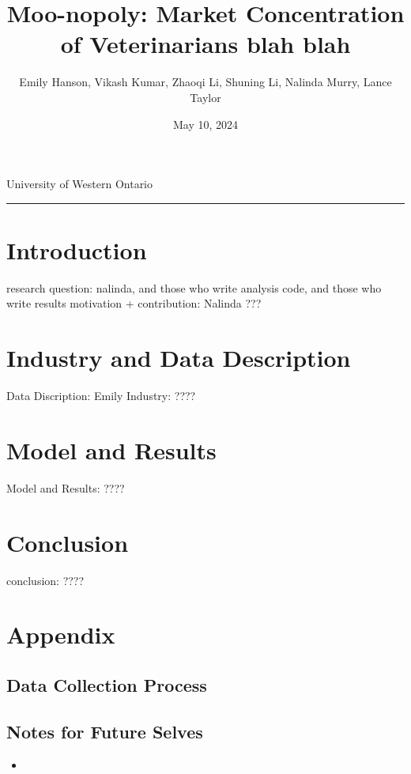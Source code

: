 \documentclass[a4paper,11pt]{article}
\title{\vspace{-1.2cm} Moo-nopoly: Market Concentration of Veterinarians blah blah}
\author{Emily Hanson, Vikash Kumar, Zhaoqi Li, Shuning Li, Nalinda Murry, Lance Taylor }
\date{May 10, 2024}
\begin{document}
\maketitle \vspace{-.4 in}
\begin{center}
University of Western Ontario
\rule{\textwidth}{1pt} 
\end{center}




\begin{abstract}
\lipsum[5]
\end{abstract}

\section{Introduction}

research question: nalinda, and those who write analysis code, and those who write results
motivation + contribution: Nalinda ??? 

\section{Industry and Data Description}

Data Discription: Emily
Industry: ????

\section{Model and Results}

Model and Results: ????

\section{Conclusion}

conclusion: ????


\newpage
\printbibliography

\newpage
\section*{Appendix}
\subsection*{Data Collection Process}

\subsection*{Notes for Future Selves}
\begin{itemize}
    \item 
\end{itemize}
\end{document}
